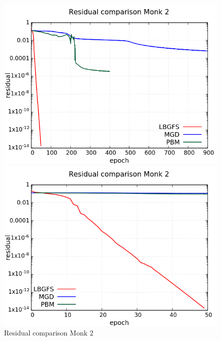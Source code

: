 \begin{figure}[H]
	\centering
	\begin{minipage}[t]{0.5\linewidth}
		\includegraphics[width=\linewidth]{data/Comparison/Monk2/Monk2_R_Comparison_log_standard.png}
	\end{minipage}%
	\begin{minipage}[t]{0.5\linewidth}
		\includegraphics[width=\linewidth]{data/Comparison/Monk2/Monk2_R_Comparison_log_zoom.png}
	\end{minipage}
	\caption{Residual comparison Monk 2}
	\label{R-Monk2}
\end{figure}
